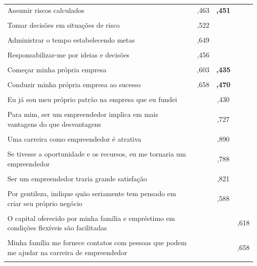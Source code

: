 \begin{longtable}[H]{p{6cm} c c c }
Assumir riscos calculados
 &   ,463 & \textbf{,451} & \\\\
 
Tomar decisões em situações de risco
 &   ,522 & & \\\\
 
Administrar o tempo estabelecendo metas
 &   ,649 & & \\\\
 
Responsabilizar-me por ideias e decisões
 & ,456 & &  \\\\
 
Começar minha própria empresa
& ,603 & \textbf{,435}  & \\\\

Conduzir minha própria empresa ao sucesso
 & ,658 & \textbf{,470}  & \\\\
Eu já sou meu próprio patrão na empresa que eu fundei
 & & ,430 &  \\\\

Para mim, ser um empreendedor implica em mais vantagens do que desvantagens
 &  & ,727  & \\\\
 
Uma carreira como empreendedor é atrativa
 &  & ,890  & \\\\
 
Se tivesse a oportunidade e os recursos, eu me tornaria um empreendedor
 &  & ,788 & \\\\
 
Ser um empreendedor traria grande satisfação
 &  & ,821 & \\\\
 
Por gentileza, indique quão seriamente tem pensado em criar seu próprio negócio
 &  & ,588 & \\\\
 
O capital oferecido por minha família e empréstimo em condições flexíveis são facilitadas
 &  & & ,618 \\\\
 
Minha família me fornece contatos com pessoas que podem me ajudar na carreira de empreendedor
 &  & & ,658 \\\\
 

\end{longtable}
